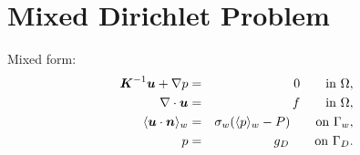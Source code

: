 
% 


\section{Mixed Dirichlet Problem}

Mixed form:
\begin{eqnarray}
    \mathbf{\boldsymbol{K}}^{-1} \mathbf{\boldsymbol{u}} + \nabla p &=& 0 \qquad \textrm{in } \Omega, \label{eqn:mixed_form_1}\\
    \nabla \cdot \mathbf{\boldsymbol{u}} &=& f \qquad \textrm{in } \Omega, \label{eqn:mixed_form_2}\\
    \langle\mathbf{\boldsymbol{u}} \cdot \mathbf{\boldsymbol{n}}\rangle_w &=& \sigma_w (\langle p\rangle_w - P) \qquad \textrm{on } \Gamma_w, \label{eqn:mixed_form_3}\\
    p &=& g_{D} \qquad \textrm{on } \Gamma_{D} \label{eqn:mixed_form_4}.
\end{eqnarray}
  
